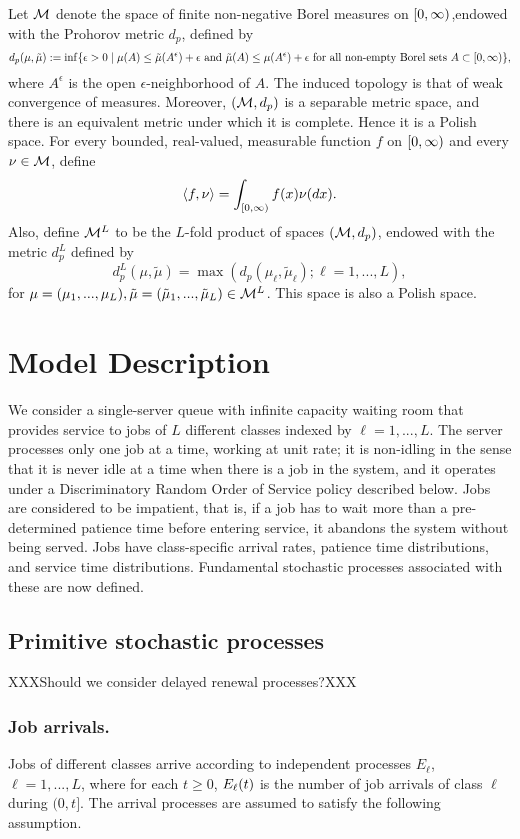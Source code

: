 \documentclass{article}
\begin{document}
Let $\mathcal{M}$ denote the space of finite non-negative Borel measures on $[0,\infty)$,endowed with  the Prohorov metric $d_p$, defined by
\[
d_p(\mu,\tilde\mu) := \inf\{ \epsilon>0 \; | \; \mu(A)\leq \tilde\mu(A^\epsilon)+\epsilon\text{ and }\tilde\mu(A)\leq \mu(A^\epsilon)+\epsilon\text{ for all non-empty Borel sets } A\subset[0,\infty)\},
\]
where $A^\epsilon$ is the open $\epsilon$-neighborhood of $A$. 
The induced topology is that of weak convergence of measures. Moreover, $(\mathcal{M}, d_p)$ is a separable metric space, and there is an equivalent metric
under which it is complete. Hence it is a Polish space.
For every bounded, real-valued, measurable function $f$ on $[0,\infty)$ and every $\nu\in\mathcal{M}$, define
\[
\langle f ,\nu \rangle = \int_{[0,\infty)}f(x)\nu(dx).
\]
Also, define $\mathcal{M}^L$ to be the $L$-fold product of spaces $(\mathcal{M},d_p)$, endowed with the metric $d_p^L$ defined by 
\[
d_p^L(\mu,\tilde\mu)=\max(d_p(\mu_\ell,\tilde\mu_\ell);\ell=1,...,L),
\]
for $\mu=(\mu_1,...,\mu_L),\tilde\mu=(\tilde\mu_1,...,\tilde\mu_L)\in\mathcal{M}^L$. This space is also a Polish space.



\section{Model Description}

We consider a single-server queue with infinite capacity waiting room that provides service to jobs of $L$ different classes indexed by $\ell=1,...,L$. The server processes only one job at a time, working at unit rate; it is non-idling in the sense that it is never idle at a time when there is a job in the system, and it operates under a Discriminatory Random Order of Service policy described below. Jobs are considered to be impatient, that is, if a job has to wait more than a pre-determined patience time before entering service, it abandons the system without being served. Jobs have class-specific arrival rates, patience time distributions, and service time distributions. Fundamental stochastic processes associated with these are now defined.


\subsection{Primitive stochastic processes}\label{sec_model}

XXXShould we consider delayed renewal processes?XXX

\subsubsection*{Job arrivals.}
Jobs of different classes arrive according to independent processes $E_\ell$, $\ell=1,...,L$, where for each $t\geq0$, $E_\ell(t)$ is the number of job arrivals of class $\ell$ during $(0,t]$. The arrival processes are assumed to satisfy the following assumption.
\end{document}
